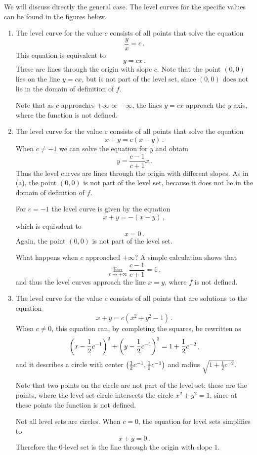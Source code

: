 \begin{solution}
We will discuss directly the general case. The level curves for the specific values can be found in the figures below.
\begin{enumerate}
\item
The level curve for the value $c$ consists of all points that solve the equation
\[
\frac y x = c\,.
\]
This equation is equivalent to
\[
y = cx\,.
\]
These are lines through the origin with slope $c$. Note that the point $(0,0)$ lies on the line $y=cx$, but is not part of the level set, since $(0,0)$ does not lie in the domain of definition of $f$.

Note that as $c$ approaches $+\infty$ or $-\infty$, the lines $y=cx$ approach the $y$-axis, where the function is not defined.

\item
The level curve for the value $c$ consists of all points that solve the equation
\[
x+y = c(x-y)\,.
\]
When $c \neq -1$ we can solve the equation for $y$ and obtain
\[
y= \frac{c-1}{c+1} x\,.
\]
Thus the level curves are lines through the origin with different slopes. As in (a), the point $(0,0)$ is not part of the level set, because it does not lie in the domain of definition of $f$.

For $c=-1$ the level curve is given by the equation
\[
x+y = -(x-y)\,,
\]
which is equivalent to
\[
x=0\,.
\]
Again, the point $(0,0)$ is not part of the level set.

What happens when $c$ approached $+\infty$? A simple calculation shows that
\[
\lim_{c \to +\infty} \frac{c-1}{c+1} = 1\,,
\]
and thus the level curves approach the line $x=y$, where $f$ is not defined.

\item
The level curve for the value $c$ consists of all points that are solutions to the equation
\[
x + y = c\left( x^2 + y^2 - 1\right)\,.
\]
When $c \neq 0$, this equation can, by completing the squares, be rewritten as
\[
\left(x - \frac 12 c^{-1}\right)^2 + \left(y - \frac 12 c^{-1}\right)^2 = 1 + \frac 12 c^{-2}\,,
\]
and it describes a circle with center $\left(\frac 12 c^{-1}, \frac 12 c^{-1}\right)$ and radius $\sqrt{1 +  \frac 12 c^{-2}}$.

Note that two points on the circle are not part of the level set: these are the points, where the level set circle intersects the circle $x^2 + y^2 = 1$, since at these points the function is not defined.

Not all level sets are circles. When $c=0$, the equation for level sets simplifies to
\[
x+y = 0\,.
\]
Therefore the $0$-level set is the line through the origin with slope $1$.
\end{enumerate}


\end{solution}
